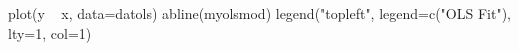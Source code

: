 \begin{Schunk}
\begin{Sinput}
  plot(y ~ x, data=datols)
  abline(myolsmod)
  legend("topleft", legend=c("OLS Fit"), lty=1, col=1)
\end{Sinput}
\end{Schunk}
